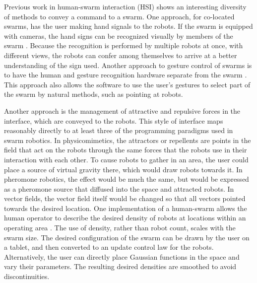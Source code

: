 Previous work in human-swarm interaction (HSI) shows an interesting diversity of methods to convey a command to a swarm. 
One approach, for co-located swarms, has the user making hand signals to the robots. 
If the swarm is equipped with cameras, the hand signs can be recognized visually by members of the swarm \citep{nagi2014online, giusti2012human, nagi2014human}. 
Because the recognition is performed by multiple robots at once, with different views, the robots can confer among themselves to arrive at a better understanding of the sign used.
Another approach to gesture control of swarms is to have the human and gesture recognition hardware separate from the swarm \citep{alonso2015gesture}.
This approach also allows the software to use the user's gestures to select part of the swarm by natural methods, such as pointing at robots. 

Another approach is the management of attractive and repulsive forces in the interface, which are conveyed to the robots. 
This style of interface maps reasonably directly to at least three of the programming paradigms used in swarm robotics. 
In physicomimetics, the attractors or repellents are points in the field that act on the robots through the same forces that the robots use in their interaction with each other. 
To cause robots to gather in an area, the user could place a source of virtual gravity there, which would draw robots towards it. 
In pheromone robotics, the effect would be much the same, but would be expressed as a pheromone source that diffused into the space and attracted robots. 
In vector fields, the vector field itself would be changed so that all vectors pointed towards the desired location. 
One implementation of a human-swarm allows the human operator to describe the desired density of robots at locations within an operating area \citep{diaz2017human}. 
The use of density, rather than robot count, scales with the swarm size.
The desired configuration of the swarm can be drawn by the user on a tablet, and then converted to an update control law for the robots.
Alternatively, the user can directly place Gaussian functions in the space and vary their parameters. 
The resulting desired densities are smoothed to avoid discontinuities.

